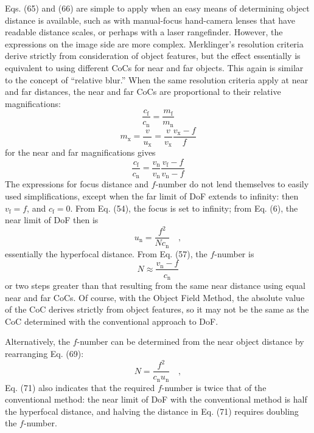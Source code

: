 \documentclass[11pt, oneside]{scrartcl}   	%
\begin{document}
Eqs. (65) and (66) are simple to apply when an easy means of determining object
distance is available, such as with manual-focus hand-camera lenses that have readable distance scales, or perhaps with a laser rangefinder. However, the expressions on the image side are more complex. Merklinger’s resolution criteria derive strictly from consideration of object features, but the effect essentially is equivalent to using different CoCs for near and far objects. This again is similar to the concept of “relative blur.” When the same resolution criteria apply at near and far distances, the near and far CoCs are proportional to their relative magnifications:
\begin{equation}
   \frac{c_\mathrm{f}}{c_\mathrm{n}}=\frac{m_\mathrm{f}}{m_\mathrm{n}}
   \label{eq:67}
\end{equation}
\begin{equation}
   m_\mathrm{x} = \frac v {u_\mathrm{x}} = \frac v {v_\mathrm{x}} \frac{v_\mathrm{x} - f}f
   \label{eq:67+}
\end{equation}
for the near and far magnifications gives
\begin{equation}
   \frac{c_\mathrm{f}}{c_\mathrm{n}} = \frac{v_\mathrm{n}}{v_\mathrm{n}} \frac{v_\mathrm{f} - f}{v_\mathrm{n} - f}
   \label{eq:68}
\end{equation}
The expressions for focus distance and $f$-number do not lend themselves to easily used simplifications, except when the far limit of DoF extends to infinity: then $v_\mathrm{f} = f$, and $c_\mathrm{f} = 0$. From Eq. (54), the focus is set to infinity; from Eq. (6), the near limit of DoF then is
\begin{equation}
   u_\mathrm{n} = \frac{f^2}{N\!c_\mathrm{n}}\quad,
   \label{eq:69}
\end{equation}
essentially the hyperfocal distance. From Eq. (57), the $f$-number is
\begin{equation}
   N \approx \frac{v_\mathrm{n} - f}{c_\mathrm{n}}
   \label{eq:70}
\end{equation}
or two steps greater than that resulting from the same near distance using equal near and far CoCs. Of course, with the Object Field Method, the absolute value of the CoC derives strictly from object features, so it may not be the same as the CoC determined with the conventional approach to DoF.

Alternatively, the $f$-number can be determined from the near object distance by rearranging Eq. (69):
\begin{equation}
   N = \frac{f^2}{c_\mathrm{n}u_\mathrm{n}}\quad,
   \label{eq:71}
\end{equation}
Eq. (71) also indicates that the required $f$-number is twice that of the conventional method: the near limit of DoF with the conventional method is half the hyperfocal distance, and halving the distance in Eq. (71) requires doubling the $f$-number.
\end{document}
